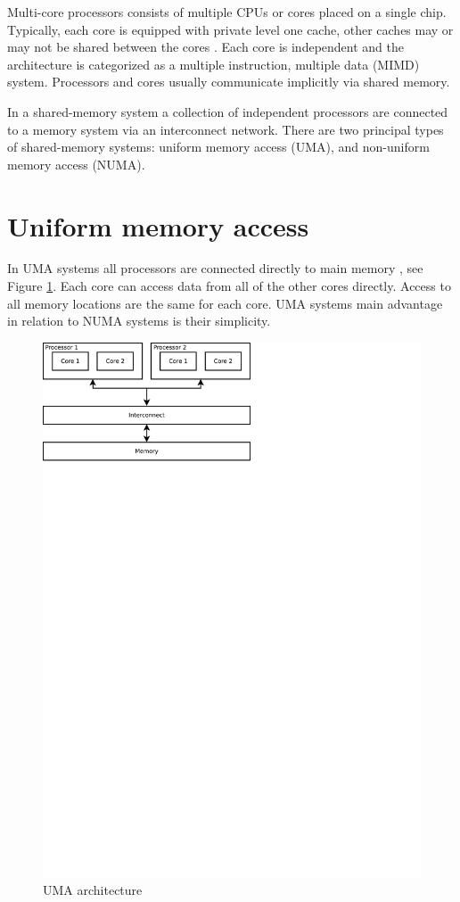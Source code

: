Multi-core processors consists of multiple CPUs or cores placed on a
single chip. Typically, each core is equipped with private level one
cache, other caches may or may not be shared between the cores
\cite{pacheco}. Each core is independent and the architecture is
categorized as a multiple instruction, multiple data (MIMD) system.
Processors and cores usually communicate implicitly via shared memory.

In a shared-memory system a collection of independent processors are
connected to a memory system via an interconnect network. There are
two principal types of shared-memory systems: uniform memory access
(UMA), and non-uniform memory access (NUMA). 

\section{Uniform memory access}

In UMA systems all processors are connected directly to main memory ,
see Figure \ref{fig:uma-arch}. Each core can access data from all of
the other cores directly. Access to all memory locations are the same
for each core. UMA systems main advantage in relation to NUMA systems
is their simplicity.

\begin{figure}[H]
	\centering
	\includegraphics[scale=0.8,trim=0 23.15cm 9.4cm 0]{img/uma}
	\caption{UMA architecture}
	\label{fig:uma-arch}
\end{figure}

